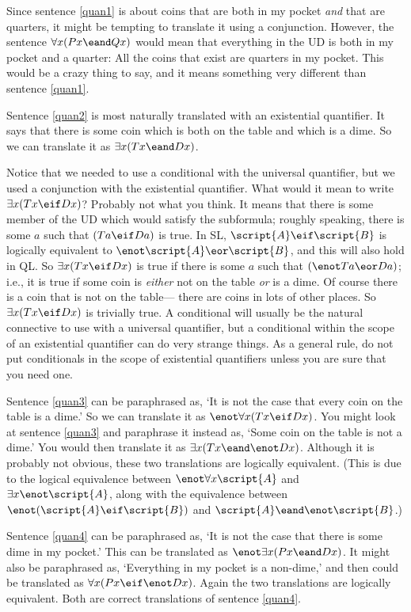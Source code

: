 Since sentence \ref{quan1} is about coins that are both in my pocket \emph{and} that are quarters, it might be tempting to translate it using a conjunction. However, the sentence $\forall x(Px \eand Qx)$ would mean that everything in the UD is both in my pocket and a quarter: All the coins that exist are quarters in my pocket. This would be a crazy thing to say, and it means something very different than sentence \ref{quan1}.

Sentence \ref{quan2} is most naturally translated with an existential quantifier. It says that there is some coin which is both on the table and which is a dime. So we can translate it as $\exists x(Tx \eand Dx)$.

Notice that we needed to use a conditional with the universal quantifier, but we used a conjunction with the existential quantifier. What would it mean to write $\exists x(Tx \eif Dx)$? Probably not what you think. It means that there is some member of the UD which would satisfy the subformula; roughly speaking, there is some $a$ such that $(Ta \eif Da)$ is true. In SL, $\script{A} \eif \script{B}$ is logically equivalent to $\enot\script{A} \eor \script{B}$, and this will also hold in QL. So $\exists x(Tx \eif Dx)$ is true if there is some $a$ such that $(\enot Ta \eor Da)$; i.e., it is true if some coin is \emph{either} not on the table \emph{or} is a dime. Of course there is a coin that is not on the table--- there are coins in lots of other places. So $\exists x(Tx \eif Dx)$ is trivially true. A conditional will usually be the natural connective to use with a universal quantifier, but a conditional within the scope of an existential quantifier can do very strange things. As a general rule, do not put conditionals in the scope of existential quantifiers unless you are sure that you need one.

Sentence \ref{quan3} can be paraphrased as, `It is not the case that every coin on the table is a dime.' So we can translate it as $\enot \forall x(Tx \eif Dx)$. You might look at sentence \ref{quan3} and paraphrase it instead as, `Some coin on the table is not a dime.' You would then translate it as $\exists x(Tx \eand \enot Dx)$. Although it is probably not obvious, these two translations are logically equivalent. (This is due to the logical equivalence between $\enot\forall x\script{A}$ and $\exists x\enot\script{A}$, along with the equivalence between $\enot(\script{A}\eif\script{B})$ and $\script{A}\eand\enot\script{B}$.)

Sentence \ref{quan4} can be paraphrased as, `It is not the case that there is some dime in my pocket.' This can be translated as $\enot\exists x(Px \eand Dx)$. It might also be paraphrased as, `Everything in my pocket is a non-dime,' and then could be translated as $\forall x(Px \eif \enot Dx)$. Again the two translations are logically equivalent. Both are correct translations of sentence \ref{quan4}.

